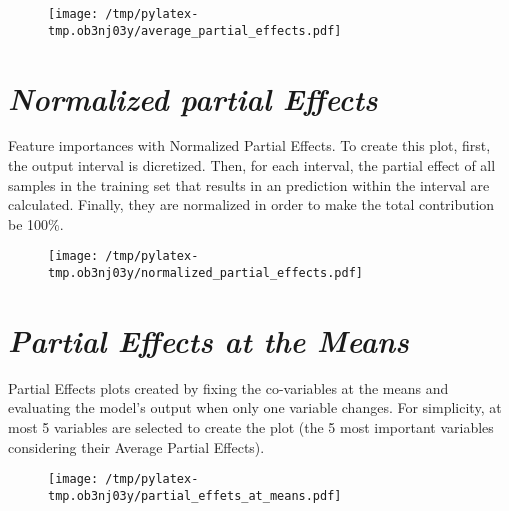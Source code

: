 \documentclass{article}%
\begin{document}
\begin{figure}[H]%
\centering%
\texttt{[image: /tmp/pylatex-tmp.ob3nj03y/average\_partial\_effects.pdf]}%
\end{figure}

%
\vfill \pagebreak

%
\section*{\textit{Normalized partial Effects}}%
\label{sec:textitNormalizedpartialEffects}%

                Feature importances with Normalized Partial Effects. 
                To create this plot, first, the output interval is dicretized.
                Then, for each interval, the partial effect of all samples
                in the training set that results in an prediction within the
                interval are calculated. Finally, they are normalized in
                order to make the total contribution be 100\%.

                \vfill%


\begin{figure}[H]%
\centering%
\texttt{[image: /tmp/pylatex-tmp.ob3nj03y/normalized\_partial\_effects.pdf]}%
\end{figure}

%
\vfill \pagebreak

%
\section*{\textit{Partial Effects at the Means}}%
\label{sec:textitPartialEffectsattheMeans}%

                Partial Effects plots created by fixing the co-variables at
                the means and evaluating the model's output when only one
                variable changes. For simplicity, at most 5 variables are
                selected to create the plot (the 5 most important variables
                considering their Average Partial Effects).

                \vfill%


\begin{figure}[H]%
\centering%
\texttt{[image: /tmp/pylatex-tmp.ob3nj03y/partial\_effets\_at\_means.pdf]}%
\end{figure}

%
\vfill \pagebreak

%
\end{document}
